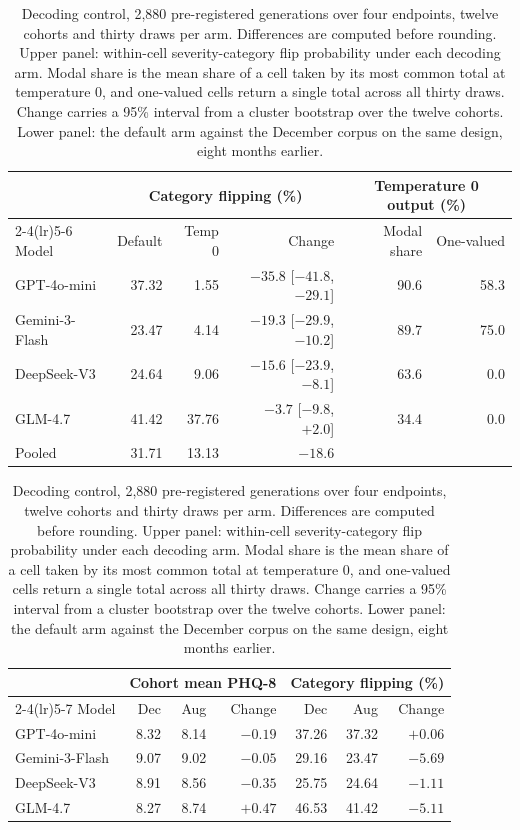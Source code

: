 \documentclass[wcp]{jmlr}
\begin{document}
\begin{table}[!htb]
\centering
\caption{Decoding control, 2,880 pre-registered generations over four endpoints, twelve cohorts and thirty draws per arm. Differences are computed before rounding. Upper panel: within-cell severity-category flip probability under each decoding arm. Modal share is the mean share of a cell taken by its most common total at temperature 0, and one-valued cells return a single total across all thirty draws. Change carries a 95\% interval from a cluster bootstrap over the twelve cohorts. Lower panel: the default arm against the December corpus on the same design, eight months earlier.}
\label{tab:decoding}
\small
\begin{tabular}{lrrrrr}
\toprule
& \multicolumn{3}{c}{Category flipping (\%)} & \multicolumn{2}{c}{Temperature 0 output (\%)} \\
\cmidrule(lr){2-4}\cmidrule(lr){5-6}
Model & Default & Temp 0 & Change & Modal share & One-valued \\
\midrule
GPT-4o-mini & 37.32 & 1.55 & $-35.8$ [$-41.8$, $-29.1$] & 90.6 & 58.3 \\
Gemini-3-Flash & 23.47 & 4.14 & $-19.3$ [$-29.9$, $-10.2$] & 89.7 & 75.0 \\
DeepSeek-V3 & 24.64 & 9.06 & $-15.6$ [$-23.9$, $-8.1$] & 63.6 & 0.0 \\
GLM-4.7 & 41.42 & 37.76 & $-3.7$ [$-9.8$, $+2.0$] & 34.4 & 0.0 \\
\midrule
Pooled & 31.71 & 13.13 & $-18.6$ & & \\
\bottomrule
\end{tabular}

\vspace{1em}

\begin{tabular}{lrrrrrr}
\toprule
& \multicolumn{3}{c}{Cohort mean PHQ-8} & \multicolumn{3}{c}{Category flipping (\%)} \\
\cmidrule(lr){2-4}\cmidrule(lr){5-7}
Model & Dec & Aug & Change & Dec & Aug & Change \\
\midrule
GPT-4o-mini & 8.32 & 8.14 & $-0.19$ & 37.26 & 37.32 & $+0.06$ \\
Gemini-3-Flash & 9.07 & 9.02 & $-0.05$ & 29.16 & 23.47 & $-5.69$ \\
DeepSeek-V3 & 8.91 & 8.56 & $-0.35$ & 25.75 & 24.64 & $-1.11$ \\
GLM-4.7 & 8.27 & 8.74 & $+0.47$ & 46.53 & 41.42 & $-5.11$ \\
\bottomrule
\end{tabular}
\end{table}
\end{document}
